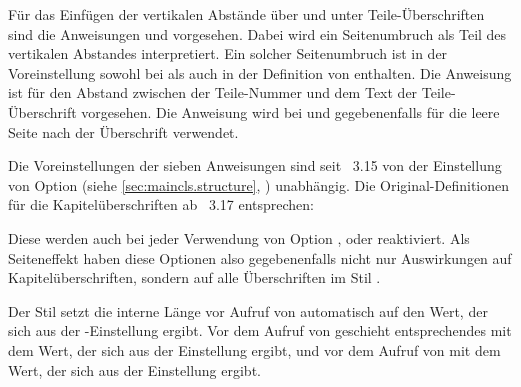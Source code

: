 Für das Einfügen der vertikalen Abstände über und unter Teile-Überschriften
sind die Anweisungen  und 
vorgesehen. Dabei wird ein Seitenumbruch als Teil des vertikalen Abstandes
interpretiert. Ein solcher Seitenumbruch ist in der Voreinstellung sowohl bei
 als auch
 in der Definition von  enthalten. Die
Anweisung  ist für den Abstand zwischen der
Teile-Nummer und dem Text der Teile-Überschrift vorgesehen. Die Anweisung
 wird bei  und 
gegebenenfalls für die leere Seite nach der Überschrift verwendet.

Die Voreinstellungen der sieben Anweisungen sind seit
\KOMAScript~3.15 von der Einstellung von Option
 (siehe \autoref{sec:maincls.structure},
) unabhängig. Die Original-Definitionen
für die Kapitelüberschriften ab
\KOMAScript~3.17 entsprechen:
\begin{lstcode}
  \newcommand*{\chapterheadstartvskip}{\vspace{\@tempskipa}}
  \newcommand*{\chapterheadmidvskip}{\par\nobreak
                                     \vskip\@tempskipa}
  \newcommand*{\chapterheadendvskip}{\vskip\@tempskipa}
\end{lstcode}
Diese werden auch bei jeder Verwendung von Option
,
 oder
 reaktiviert. Als Seiteneffekt haben
diese Optionen also gegebenenfalls nicht nur Auswirkungen auf
Kapitelüberschriften, sondern auf alle Überschriften im Stil .

Der Stil  setzt die interne Länge
 vor Aufruf von
 automatisch auf den Wert, der sich aus der
-Einstellung%
  ergibt. Vor dem Aufruf
von  geschieht entsprechendes mit dem Wert, der
sich aus der Einstellung
 ergibt, und vor dem Aufruf von 
mit dem Wert, der sich aus der Einstellung 
ergibt.

